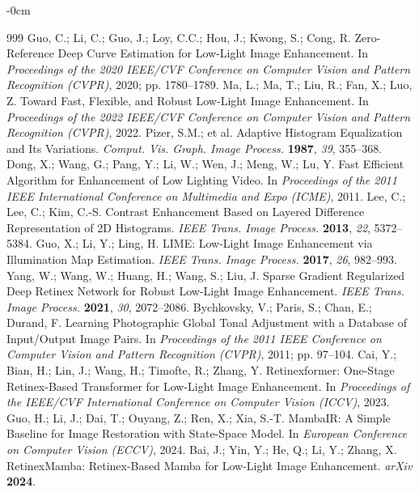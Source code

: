 \documentclass[sensors,article,submit,moreauthors]{Definitions/mdpi}
\begin{document}
\begin{adjustwidth}{-\extralength}{0cm}
\begin{thebibliography}{999}
 Guo, C.; Li, C.; Guo, J.; Loy, C.C.; Hou, J.; Kwong, S.; Cong, R. Zero-Reference Deep Curve Estimation for Low-Light Image Enhancement. In \textit{Proceedings of the 2020 IEEE/CVF Conference on Computer Vision and Pattern Recognition (CVPR)}, 2020; pp. 1780--1789.
 Ma, L.; Ma, T.; Liu, R.; Fan, X.; Luo, Z. Toward Fast, Flexible, and Robust Low-Light Image Enhancement. In \textit{Proceedings of the 2022 IEEE/CVF Conference on Computer Vision and Pattern Recognition (CVPR)}, 2022.
 Pizer, S.M.; et al. Adaptive Histogram Equalization and Its Variations. \textit{Comput. Vis. Graph. Image Process.} \textbf{1987}, \textit{39}, 355--368.
 Dong, X.; Wang, G.; Pang, Y.; Li, W.; Wen, J.; Meng, W.; Lu, Y. Fast Efficient Algorithm for Enhancement of Low Lighting Video. In \textit{Proceedings of the 2011 IEEE International Conference on Multimedia and Expo (ICME)}, 2011.
 Lee, C.; Lee, C.; Kim, C.-S. Contrast Enhancement Based on Layered Difference Representation of 2D Histograms. \textit{IEEE Trans. Image Process.} \textbf{2013}, \textit{22}, 5372--5384.
 Guo, X.; Li, Y.; Ling, H. LIME: Low-Light Image Enhancement via Illumination Map Estimation. \textit{IEEE Trans. Image Process.} \textbf{2017}, \textit{26}, 982--993.
 Yang, W.; Wang, W.; Huang, H.; Wang, S.; Liu, J. Sparse Gradient Regularized Deep Retinex Network for Robust Low-Light Image Enhancement. \textit{IEEE Trans. Image Process.} \textbf{2021}, \textit{30}, 2072--2086.
 Bychkovsky, V.; Paris, S.; Chan, E.; Durand, F. Learning Photographic Global Tonal Adjustment with a Database of Input/Output Image Pairs. In \textit{Proceedings of the 2011 IEEE Conference on Computer Vision and Pattern Recognition (CVPR)}, 2011; pp. 97--104.
 Cai, Y.; Bian, H.; Lin, J.; Wang, H.; Timofte, R.; Zhang, Y. Retinexformer: One-Stage Retinex-Based Transformer for Low-Light Image Enhancement. In \textit{Proceedings of the IEEE/CVF International Conference on Computer Vision (ICCV)}, 2023.
 Guo, H.; Li, J.; Dai, T.; Ouyang, Z.; Ren, X.; Xia, S.-T. MambaIR: A Simple Baseline for Image Restoration with State-Space Model. In \textit{European Conference on Computer Vision (ECCV)}, 2024.
 Bai, J.; Yin, Y.; He, Q.; Li, Y.; Zhang, X. RetinexMamba: Retinex-Based Mamba for Low-Light Image Enhancement. \textit{arXiv} \textbf{2024}.
\end{thebibliography}

\PublishersNote{}
\end{adjustwidth}
\end{document}
